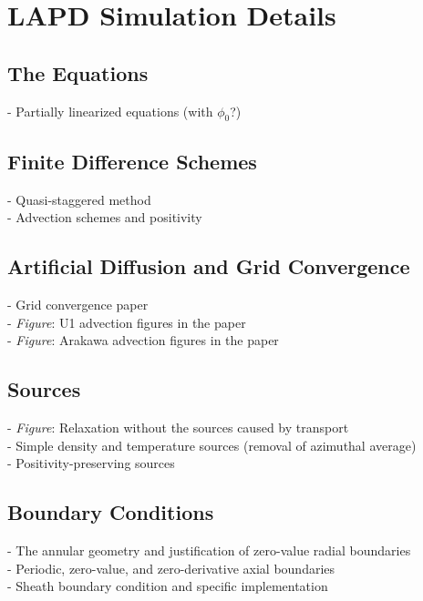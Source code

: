 \documentclass[12pt]{article}
\begin{document}
\section{LAPD Simulation Details}

\subsection{The Equations}

- Partially linearized equations (with $\phi_0$?) \\

\subsection{Finite Difference Schemes}

- Quasi-staggered method \\
- Advection schemes and positivity \\

\subsection{Artificial Diffusion and Grid Convergence}

- Grid convergence paper \\
- \emph{Figure}: U1 advection figures in the paper \\
- \emph{Figure}: Arakawa advection figures in the paper \\

\subsection{Sources}

- \emph{Figure}: Relaxation without the sources caused by transport \\
- Simple density and temperature sources (removal of azimuthal average) \\
- Positivity-preserving sources \\

\subsection{Boundary Conditions}

- The annular geometry and justification of zero-value radial boundaries \\
- Periodic, zero-value, and zero-derivative axial boundaries \\
- Sheath boundary condition and specific implementation \\
\end{document}

